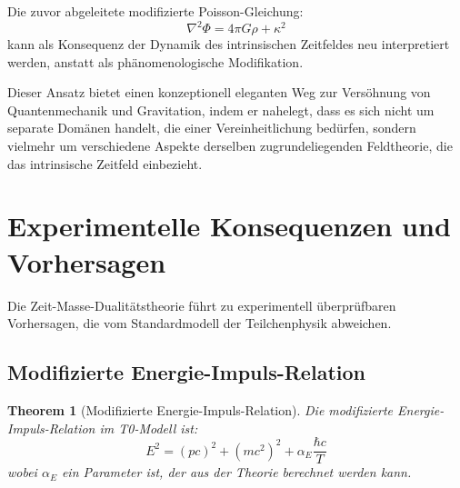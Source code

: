 \documentclass{article}
\newtheorem{theorem}{Theorem}[section]
\theoremstyle{definition}
\theoremstyle{remark}
\begin{document}
		Die zuvor abgeleitete modifizierte Poisson-Gleichung:
		\begin{equation}
			\nabla^2 \Phi = 4\pi G \rho + \kappa^2
		\end{equation}
		kann als Konsequenz der Dynamik des intrinsischen Zeitfeldes neu interpretiert werden, anstatt als phänomenologische Modifikation.
		
		Dieser Ansatz bietet einen konzeptionell eleganten Weg zur Versöhnung von Quantenmechanik und Gravitation, indem er nahelegt, dass es sich nicht um separate Domänen handelt, die einer Vereinheitlichung bedürfen, sondern vielmehr um verschiedene Aspekte derselben zugrundeliegenden Feldtheorie, die das intrinsische Zeitfeld einbezieht.
		
		
		\section{Experimentelle Konsequenzen und Vorhersagen}
		
		Die Zeit-Masse-Dualitätstheorie führt zu experimentell überprüfbaren Vorhersagen, die vom Standardmodell der Teilchenphysik abweichen.
		
		\subsection{Modifizierte Energie-Impuls-Relation}
		
		\begin{theorem}[Modifizierte Energie-Impuls-Relation]
			Die modifizierte Energie-Impuls-Relation im T0-Modell ist:
			\begin{equation}
				E^2 = (pc)^2 + (mc^2)^2 + \alpha_E\frac{\hbar c}{T}
			\end{equation}
			wobei $\alpha_E$ ein Parameter ist, der aus der Theorie berechnet werden kann.
		\end{theorem}
		
\end{document}
